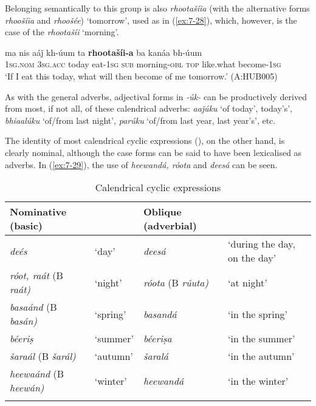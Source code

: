 Belonging semantically to this group is also \textit{rhootašíia} (with the alternative forms \textit{rhoošíia} and \textit{rhoošée}) `tomorrow', used as in (\ref{ex:7-28}), which, however, is the  case of the  \textit{rhootašíi} `morning'.

\ea
\label{ex:7-28}
\gll ma nis aáǰ kh-úum ta \textbf{rhootašíi-a} ba kanáa bh-úum\\
\textsc{1sg.nom} \textsc{3sg.acc} today eat-\textsc{1sg} \textsc{sub} morning-\textsc{obl} \textsc{top} like.what become-\textsc{1sg}\\
\glt `If I eat this today, what will then become of me tomorrow.' (A:HUB005)
\z

As with the general  adverbs, adjectival forms in \textit{-úk-} can be productively derived from most, if not all, of these calendrical adverbs: \textit{aaǰúku} `of today', today's', \textit{bhiaalúku} `of/from last night', \textit{parúku} `of/from last year, last year's', etc. 


The identity of most calendrical cyclic expressions (), on the other hand, is clearly nominal, although the  case forms can be said to have been lexicalised as adverbs. In (\ref{ex:7-29}), the use of \textit{heewandá, róota} and \textit{deesá} can be seen.


\begin{table}[t]
\caption{Calendrical cyclic expressions}
\begin{tabularx}{\textwidth}{ Q l l Q }
\lsptoprule
Nominative (basic) &
&
Oblique (adverbial) &
\\\midrule
\textit{deés} &
`day' &
\textit{deesá} &
`during the day, on the day'\\
\textit{róot, raát} (B \textit{raát)} &
`night' &
\textit{róota} (B \textit{rúuta)} &
`at night'\\
\textit{basaánd} (B \textit{basán)} &
`spring' &
\textit{basandá} &
`in the spring'\\
\textit{béeriṣ} &
`summer' &
\textit{béeriṣa} &
`in the summer'\\
\textit{šaraál} (B \textit{šarál)} &
`autumn' &
\textit{šaralá} &
`in the autumn'\\
\textit{heewaánd} (B \textit{heewán)} &
`winter' &
\textit{heewandá} &
`in the winter'\\\lspbottomrule
\end{tabularx}
\label{tab:7-2}
\end{table}

